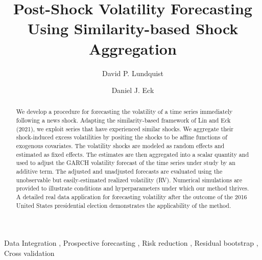 \documentclass[11pt,3p,review,authoryear]{elsarticle}
\begin{document}
\begin{frontmatter}

\title{Post-Shock Volatility Forecasting Using Similarity-based Shock Aggregation}

  \author[uiuc]{David P. Lundquist}

 \author[uiuc]{Daniel J. Eck}
 \address[uiuc]{Department of Statistics, University of Illinois at Urbana-Champaign\\
 605 E. Springfield Ave. Champaign, IL 61820}


\begin{abstract}
 We develop a procedure for forecasting the volatility of a time series immediately following a news shock.  Adapting the similarity-based framework of Lin and Eck (2021), we exploit series that have experienced similar shocks.  We aggregate their shock-induced excess volatilities by positing the shocks to be affine functions of exogenous covariates.  The volatility shocks are modeled as random effects and estimated as fixed effects.  The estimates are then aggregated into a scalar quantity and used to adjust the GARCH volatility forecast of the time series under study by an additive term.  The adjusted and unadjusted forecasts are evaluated using the unobservable but easily-estimated realized volatility (RV). Numerical simulations are provided to illustrate conditions and hyperparameters under which our method thrives. A detailed real data application for forecasting volatility after the outcome of the 2016 United States presidential election demonstrates the applicability of the method.
\end{abstract}

\begin{keyword}
  Data Integration \sep 
 Prospective forecasting \sep 
 Risk reduction \sep 
Residual bootstrap \sep 
Cross validation 
\end{keyword}

\end{frontmatter}
\end{document}
